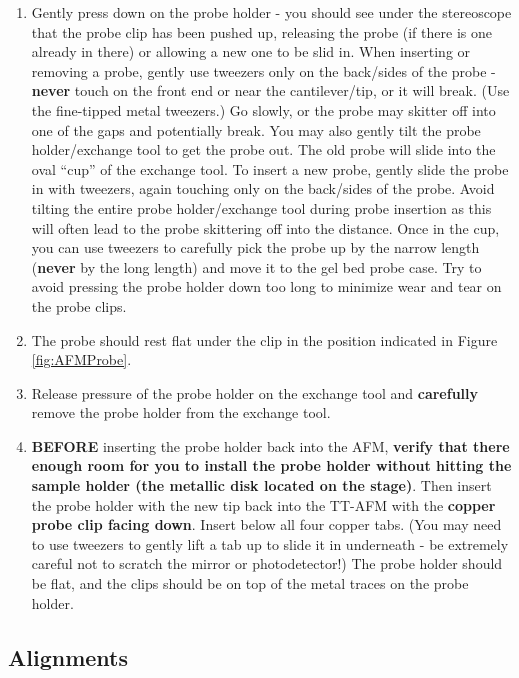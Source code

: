 \documentclass{../lab}
\begin{document}
\begin{enumerate}
     \item Gently press down on the probe holder - you should see under the stereoscope that the probe clip has been pushed up, releasing the probe (if there is one already in there) or allowing a new one to be slid in. When inserting or removing a probe, gently use tweezers only on the back/sides of the probe - \textbf{never} touch on the front end or near the cantilever/tip, or it will break. (Use the fine-tipped metal tweezers.) Go slowly, or the probe may skitter off into one of the gaps and potentially break. You may also gently tilt the probe holder/exchange tool to get the probe out. The old probe will slide into the oval ``cup'' of the exchange tool. To insert a new probe, gently slide the probe in with tweezers, again touching only on the back/sides of the probe. Avoid tilting the entire probe holder/exchange tool during probe insertion as this will often lead to the probe skittering off into the distance. Once in the cup, you can use tweezers to carefully pick the probe up by the narrow length (\textbf{never} by the long length) and move it to the gel bed probe case. Try to avoid pressing the probe holder down too long to minimize wear and tear on the probe clips.
     \item  The probe should rest flat under the clip in the position indicated in Figure \ref{fig:AFMProbe}.
    
    \item  Release pressure of the probe holder on the exchange tool and \textbf{carefully} remove the probe holder from the exchange tool.
    
    \item \textbf{BEFORE} inserting the probe holder back into the AFM, \textbf{verify that there enough room for you to install the probe holder without hitting the sample holder (the metallic disk located on the stage)}.  Then insert the probe holder with the new tip back into the TT-AFM with the \textbf{copper probe clip facing down}. Insert below all four copper tabs. (You may need to use tweezers to gently lift a tab up to slide it in underneath - be extremely careful not to scratch the mirror or photodetector!) The probe holder should be flat, and the clips should be on top of the metal traces on the probe holder.
    
\end{enumerate}

\subsection{Alignments}
\label{sec:Alignment}
\end{document}
